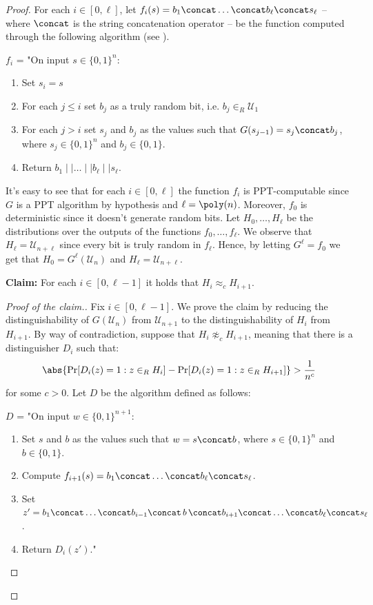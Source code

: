 \documentclass[a4paper, 12pt]{report}
\begin{document}
    \begin{proof}
        For each $i \in [0, \ell]$, let $f_i(s) = b_1 \concat \ldots \concat b_\ell \concat s_\ell$ -- where $\concat$ is the string concatenation operator -- be the function computed through the following algorithm (see ).

        $f_i$ = "On input $s \in \{0,1\}^n$: 
        \begin{enumerate}
            \item Set $s_i = s$
            \item For each $j \leq i$ set $b_j$ as a truly random bit, i.e. $b_j \in_R \mathcal{U}_1$
            \item For each $j > i$ set $s_j$ and $b_j$ as the values such that $G(s_{j-1}) = s_j \concat b_j$, where $s_j \in \{0,1\}^n$ and $b_j \in \{0,1\}$.
            \item Return $b_1 \mid\mid \ldots \mid\mid b_\ell \mid\mid s_\ell$.
        \end{enumerate}

        It's easy to see that for each $i \in [0,\ell]$ the function $f_i$ is PPT-computable since $G$ is a PPT algorithm by hypothesis and $\ell = \poly(n)$. Moreover, $f_0$ is deterministic since it doesn't generate random bits. Let $H_0, \ldots, H_\ell$ be the distributions over the outputs of the functions $f_0, \ldots, f_\ell$. We observe that $H_\ell = \mathcal{U}_{n+\ell}$ since every bit is truly random in $f_\ell$. Hence, by letting $G^\ell = f_0$ we get that $H_0 = G^\ell(\mathcal{U}_n)$ and $H_\ell = \mathcal{U}_{n+\ell}$.

        \textbf{Claim:} For each $i \in [0,\ell-1]$ it holds that $H_i \approx_c H_{i+1}$.

        \begin{proof}[Proof of the claim.]
            Fix $i \in [0,\ell-1]$. We prove the claim by reducing the distinguishability of $G(\mathcal{U}_n)$ from $\mathcal{U}_{n+1}$ to the distinguishability of $H_i$ from $H_{i+1}$. By way of contradiction, suppose that $H_i \not\approx_c H_{i+1}$, meaning that there is a distinguisher $D_i$ such that:
            \[\abs{\Pr[D_i(z) = 1 : z \in_R H_i] - \Pr[D_i(z) = 1 : z \in_R H_{i+1}]} > \frac{1}{n^c}\]
            for some $c > 0$. Let $D$ be the algorithm defined as follows:

            $D$ = "On input $w \in \{0,1\}^{n+1}$:
            \begin{enumerate}
                \item Set $s$ and $b$ as the values such that $w = s \concat b$, where $s \in \{0,1\}^n$ and $b \in \{0,1\}$.
                \item Compute $f_{i+1}(s) = b_1 \concat \ldots \concat b_\ell \concat s_\ell$.
                \item Set $z' = b_1 \concat \ldots \concat b_{i-1} \concat \, b\,  \concat b_{i+1} \concat \ldots \concat b_\ell \concat s_\ell$.
                \item Return $D_i(z')$."
            \end{enumerate}


\end{proof}
\end{proof}
\end{document}
